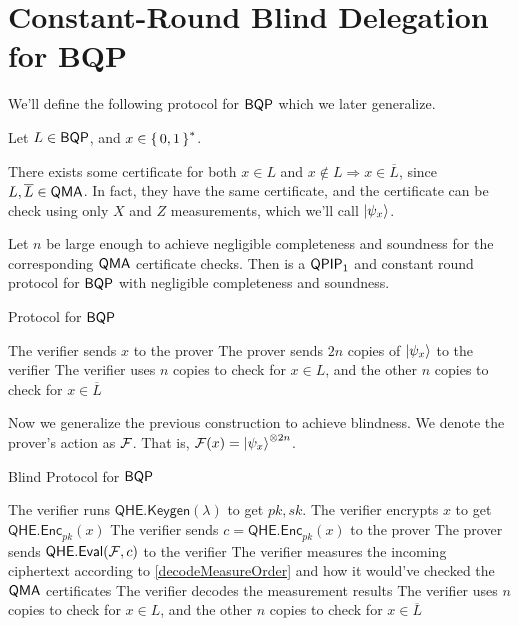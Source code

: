 \section{Constant-Round Blind Delegation for BQP}


We'll define the following protocol for $\operatorname{\mathsf{BQP}}$ which we later generalize.

Let $L\in\operatorname{\mathsf{BQP}}$, and $x\in\set{0,1}^*$.

There exists some certificate for both $x\in L$ and $x\notin L\Rightarrow x\in\overline{L}$, since $L, \overline{L}\in\operatorname{\mathsf{QMA}}$.
In fact, they have the same certificate, and the certificate can be check using only $X$ and $Z$ measurements, which we'll call $\ket{\psi_x}$. 

\begin{thm}
	Let $n$ be large enough to achieve negligible completeness and soundness for the corresponding $\operatorname{\mathsf{QMA}}$ certificate checks.
	Then  is a $\operatorname{\mathsf{QPIP}}_1$ and constant round protocol for $\operatorname{\mathsf{BQP}}$ with negligible completeness and soundness.
\end{thm}

\begin{algorithm}
	\caption{Protocol for $\operatorname{\mathsf{BQP}}$}
	\label{proto:BQP}
	\begin{algorithmic}[1]
		\State The verifier sends $x$ to the prover
		\State The prover sends $2n$ copies of $\ket{\psi_x}$ to the verifier
		\State The verifier uses $n$ copies to check for $x\in L$, and the other $n$ copies to check for $x\in\overline{L}$
	\end{algorithmic}
\end{algorithm}

Now we generalize the previous construction to achieve blindness.
We denote the prover's action as $\mathcal{F}$. That is, $\mathcal{F}(x)=\ket{\psi_x}^{\otimes 2n}$.

\begin{algorithm}
	\caption{Blind Protocol for $\operatorname{\mathsf{BQP}}$}
	\label{proto:BlindBQP}
	\begin{algorithmic}[1]
		\State The verifier runs $\mathsf{QHE.Keygen}(\lambda)$ to get $pk, sk$.
		\State The verifier encrypts $x$ to get $\mathsf{QHE.Enc}_{pk}(x)$
		\State The verifier sends $c=\mathsf{QHE.Enc}_{pk}(x)$ to the prover
		\State The prover sends $\mathsf{QHE.Eval}(\mathcal{F}, c)$ to the verifier
		\State The verifier measures the incoming ciphertext according to \autoref{decodeMeasureOrder} and how it would've checked the $\operatorname{\mathsf{QMA}}$ certificates
		\State The verifier decodes the measurement results
		\State The verifier uses $n$ copies to check for $x\in L$, and the other $n$ copies to check for $x\in\overline{L}$
	\end{algorithmic}
\end{algorithm}

